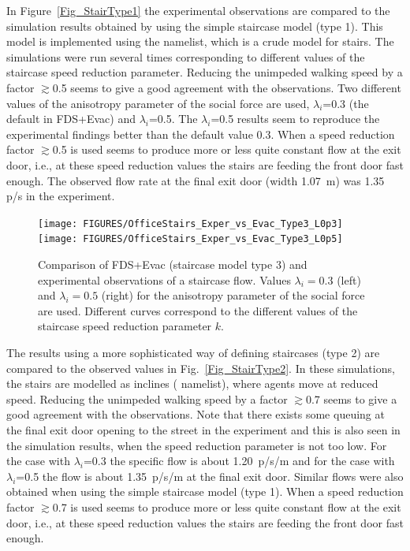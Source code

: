 \documentclass[12pt,a4paper,final,twoside]{stylevk}
\begin{document}
\begin{enumerate}
In Figure~\ref{Fig_StairType1} the experimental observations are
compared to the simulation results obtained by using the simple
staircase model (type 1).  This model is implemented using the
 namelist, which is a crude model for stairs.  The
simulations were run several times corresponding to different values
of the staircase speed reduction parameter.  Reducing the unimpeded
walking speed by a factor $\gtrsim$0.5 seems to give a good agreement
with the observations.  Two different values of the anisotropy
parameter of the social force are used, $\lambda_i$=0.3 (the default
in FDS+Evac) and $\lambda_i$=0.5.  The $\lambda_i$=0.5 results seem to
reproduce the experimental findings better than the default value 0.3.
When a speed reduction factor $\gtrsim$0.5 is used seems to produce
more or less quite constant flow at the exit door, i.e., at
these speed reduction values the stairs are feeding the front door
fast enough.  The observed flow rate at the final exit door (width
1.07~m) was 1.35 p/s in the experiment.

%
\begin{figure}[!tb]
  \centerline{\texttt{[image: FIGURES/OfficeStairs\_Exper\_vs\_Evac\_Type3\_L0p3]}\texttt{[image: FIGURES/OfficeStairs\_Exper\_vs\_Evac\_Type3\_L0p5]}}
  \caption{Comparison of FDS+Evac (staircase model type 3) and
    experimental observations of a staircase flow.  Values
    $\lambda_i=0.3$ (left) and $\lambda_i=0.5$ (right) for the
    anisotropy parameter of the social force are used.  Different
    curves correspond to the different values of the staircase speed
    reduction parameter $k$.}\label{Fig_StairType3}
\end{figure}

The results using a more sophisticated way of defining staircases
(type 2) are compared to the observed values in
Fig.~\ref{Fig_StairType2}.  In these simulations, the stairs are
modelled as inclines ( namelist), where agents move at
reduced speed.  Reducing the unimpeded walking speed by a factor
$\gtrsim$0.7 seems to give a good agreement with the observations.
Note that there exists some queuing at the final exit door opening to
the street in the experiment and this is also seen in the simulation
results, when the speed reduction parameter is not too low.  For the
case with $\lambda_i$=0.3 the specific flow is about 1.20~p/s/m and
for the case with $\lambda_i$=0.5 the flow is about 1.35~p/s/m at the
final exit door.  Similar flows were also obtained when using the
simple staircase model (type 1).  When a speed reduction factor
$\gtrsim$0.7 is used seems to produce more or less quite constant flow
at the exit door, i.e., at these speed reduction values the
stairs are feeding the front door fast enough.
%



\end{enumerate}
\end{document}
